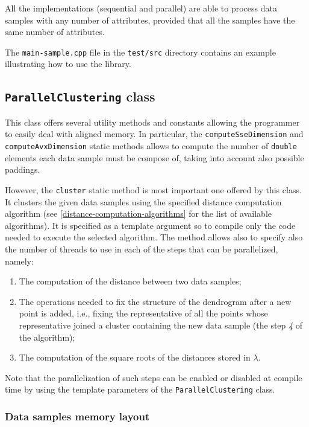 \documentclass{article}
\begin{document}
All the implementations (sequential and parallel) are able to process data samples with any
number of attributes, provided that all the samples have the same number of attributes.

The \texttt{main-sample.cpp} file in the \texttt{test/src} directory contains an example
illustrating how to use the library.

\hypertarget{parallel-clustering}{%
\subsection{\texttt{ParallelClustering} class}
\label{parallel-clustering}}
This class offers several utility methods and constants allowing the programmer to easily deal
with aligned memory. In particular, the \texttt{computeSseDimension} and
\texttt{computeAvxDimension} static methods allows to compute the number of \texttt{double}
elements each data sample must be compose of, taking into account also possible paddings.

However, the \texttt{cluster} static method is most important one offered by this class. It clusters
the given data samples using the specified distance computation algorithm (see
\ref{distance-computation-algorithms} for the list of available algorithms).
It is specified as a template argument so to compile only the code needed to execute the selected
algorithm.
The method allows also to specify also the number of threads to use in each of the steps that can be
parallelized, namely:
\begin{enumerate}
\item The computation of the distance between two data samples;
\item The operations needed to fix the structure of the dendrogram after a new point is
added, i.e., fixing the representative of all the points whose representative joined a
cluster containing the new data sample (the step \textit{4} of the algorithm);
\item The computation of the square roots of the distances stored in $\lambda$.
\end{enumerate}
Note that the parallelization of such steps can be enabled or disabled at compile time by using the
template parameters of the \texttt{ParallelClustering} class.

\hypertarget{par-data-samples-layout}{
\subsubsection{Data samples memory layout}
\label{par-data-samples-layout}}
\end{document}
